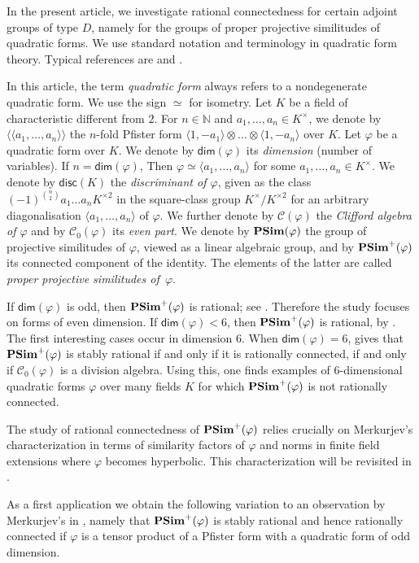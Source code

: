 \documentclass[twoside,11pt]{amsart}
\numberwithin{equation}{section}
\theoremstyle{definition}
\renewcommand{\dim}{\operatorname{\mathsf{dim}}}
\newcommand{\vf}{\varphi}
\newcommand{\mg}[1]{{#1}^{\times}}
\newcommand{\sq}[1]{{#1}^{\times 2}}
\newcommand{\scg}[1]{\mg{#1}/\sq{#1}}
\newcommand{\nat}{\mathbb{N}}
\newcommand{\la}{\langle}
\newcommand{\ra}{\rangle}
\newcommand{\lla}{\la\!\la}
\newcommand{\rra}{\ra\!\ra}
\newcommand{\mc}{\mathcal}
\newcommand{\disc}{\mathsf{disc}}
\renewcommand{\dim}{\mathsf{dim}}
\begin{document}
In the present article, we investigate  rational connectedness for certain adjoint groups of type $D$, namely for the groups of proper projective similitudes of quadratic forms. 
We use standard notation and terminology in quadratic form theory. 
Typical references are \cite{EKM08} and \cite{Lam05}.

In this article, the term \emph{quadratic form} always refers to a nondegenerate quadratic form.
We use the sign $\simeq$ for isometry.
Let $K$ be a field of characteristic different from $2$.
For $n\in\nat$ and $a_1,\dots,a_n\in\mg{K}$, we denote by $\lla a_1,\dots,a_n\rra$ the $n$-fold Pfister form $\la 1,-a_1\ra\otimes\dots\otimes\la 1,-a_n\ra$ over $K$.
Let $\vf$ be a quadratic form over $K$. We denote by $\dim(\vf)$ its \emph{dimension} (number of variables).
If $n=\dim(\vf)$,
Then $\vf\simeq \la a_1,\dots,a_n\ra$ for some $a_1,\dots,a_n\in\mg{K}$.
We denote by $\disc(K)$ the \emph{discriminant of $\vf$}, given as the class $(-1)^{\binom{n}{2}}a_1\dots a_n\sq{K}$ in the square-class group $\scg{K}$ for an arbitrary diagonalisation $\la a_1,\dots,a_n\ra$ of $\vf$.
We further denote by $\mc{C}(\vf)$ the \emph{Clifford algebra of $\vf$} and by $\mc{C}_0(\vf)$
 its \emph{even part}.
We denote by  ${\bf PSim}(\varphi)$ the group of projective similitudes of $\varphi$, viewed as a linear algebraic group, and by ${\bf PSim}^+(\varphi)$ its connected component of the identity.
The elements of the latter are called \emph{proper projective similitudes of~$\varphi$}.


If $\dim(\vf)$ is odd, then  ${\bf PSim}^+(\vf)$ is rational; see \cite[p.~200]{Mer96}.
Therefore the study focuses on forms of even dimension.
If $\dim(\vf)<6$, then ${\bf PSim}^+(\vf)$ is rational, by \cite[Prop.~5]{Mer96}.
The first interesting cases occur in dimension $6$. 
When $\dim(\vf)=6$, \cite[Theorem 3]{Mer96} gives that
${\bf PSim}^+(\vf)$ is stably rational if and only if it is rationally connected, if and only if $\mc{C}_0(\vf)$ is a division algebra.
Using this, one finds examples of $6$-dimensional quadratic forms $\vf$ over many fields $K$ for which ${\bf PSim}^+(\vf)$ is not rationally connected.

The study of rational connectedness of ${\bf PSim}^+(\varphi)$ relies crucially on Merkurjev's characterization in terms of similarity factors of $\vf$ and norms in finite field extensions where $\varphi$ becomes hyperbolic.
This characterization will be revisited in .

As a first application we obtain the following variation to an observation by
Merkurjev's in \cite[Prop.~7]{Mer96}, namely that ${\bf PSim}^+(\vf)$ is stably rational and hence rationally connected if $\varphi$ is a tensor product of a Pfister form with a quadratic form of odd dimension.
\end{document}
